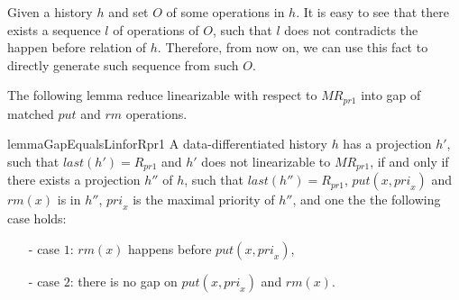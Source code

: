 \documentclass{llncs}
\begin{document}
Given a history $h$ and set $O$ of some operations in $h$. It is easy to see that there exists a sequence $l$ of operations of $O$, such that $l$ does not contradicts the happen before relation of $h$. Therefore, from now on, we can use this fact to directly generate such sequence from such $O$.


The following lemma reduce linearizable with respect to $\textit{MR}_{\textit{pr1}}$ into gap of matched $\textit{put}$ and $\textit{rm}$ operations.

\begin{restatable}{lemma}{GapEqualsLinforRpr1}
\label{lemma:Gap Equals Lin for Rpr1}
A data-differentiated history $h$ has a projection $h'$, such that $\textit{last}(h') = R_{\textit{pr1}}$ and $h'$ does not linearizable to $\textit{MR}_{\textit{pr1}}$, if and only if there exists a projection $h''$ of $h$, such that $\textit{last}(h'') = R_{\textit{pr1}}$, $\textit{put}(x,\textit{pri}_x)$ and $\textit{rm}(x)$ is in $h''$, $\textit{pri}_x$ is the maximal priority of $h''$, and one the the following case holds:

\begin{itemize}
\setlength{\itemsep}{0.5pt}
\item[-] case $1$: $\textit{rm}(x)$ happens before $\textit{put}(x,\textit{pri}_x)$,
\item[-] case $2$: there is no gap on $\textit{put}(x,\textit{pri}_x)$ and $\textit{rm}(x)$.
\end{itemize}
\end{restatable}
\end{document}
